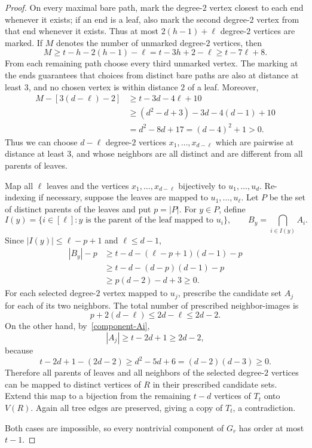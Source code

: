\documentclass[10pt,a4paper]{amsart}
\begin{document}
\begin{proof}
On every maximal bare path, mark the degree-$2$ vertex closest to each end whenever it exists; if an end is a leaf, also mark the second degree-$2$ vertex from that end whenever it exists. Thus at most $2(h-1)+\ell$ degree-$2$ vertices are marked. If $M$ denotes the number of unmarked degree-$2$ vertices, then
\[
M\ge t-h-2(h-1)-\ell=t-3h+2-\ell\ge t-7\ell+8.
\]
From each remaining path choose every third unmarked vertex. The marking at the ends guarantees that choices from distinct bare paths are also at distance at least $3$, and no chosen vertex is within distance $2$ of a leaf. Moreover,
\[
\begin{aligned}
M-[3(d-\ell)-2]
&\ge t-3d-4\ell+10\\
&\ge(d^2-d+3)-3d-4(d-1)+10\\
&=d^2-8d+17=(d-4)^2+1>0.
\end{aligned}
\]
Thus we can choose $d-\ell$ degree-$2$ vertices $x_1,\ldots,x_{d-\ell}$ which are pairwise at distance at least $3$, and whose neighbors are all distinct and are different from all parents of leaves.

Map all $\ell$ leaves and the vertices $x_1,\ldots,x_{d-\ell}$ bijectively to $u_1,\ldots,u_d$. Re-indexing if necessary, suppose the leaves are mapped to $u_1,\ldots,u_\ell$. Let $P$ be the set of distinct parents of the leaves and put $p=|P|$. For $y\in P$, define
\[
I(y)=\{i\in[\ell]:y\text{ is the parent of the leaf mapped to }u_i\},
\qquad B_y=\bigcap_{i\in I(y)}A_i.
\]
Since $|I(y)|\le\ell-p+1$ and $\ell\le d-1$,
\[
\begin{aligned}
|B_y|-p
&\ge t-d-(\ell-p+1)(d-1)-p\\
&\ge t-d-(d-p)(d-1)-p\\
&\ge p(d-2)-d+3\ge0.
\end{aligned}
\]
For each selected degree-$2$ vertex mapped to $u_j$, prescribe the candidate set $A_j$ for each of its two neighbors. The total number of prescribed neighbor-images is
\[
p+2(d-\ell)\le2d-\ell\le2d-2.
\]
On the other hand, by~\eqref{component-Ai},
\[
|A_j|\ge t-2d+1\ge2d-2,
\]
because
\[
t-2d+1-(2d-2)\ge d^2-5d+6=(d-2)(d-3)\ge0.
\]
Therefore all parents of leaves and all neighbors of the selected degree-$2$ vertices can be mapped to distinct vertices of $R$ in their prescribed candidate sets. Extend this map to a bijection from the remaining $t-d$ vertices of $T_t$ onto $V(R)$. Again all tree edges are preserved, giving a copy of $T_t$, a contradiction.

Both cases are impossible, so every nontrivial component of $G_r$ has order at most $t-1$.
\end{proof}
\end{document}
